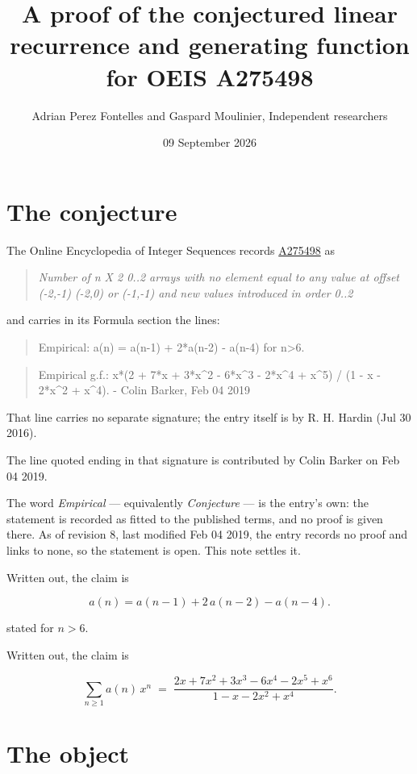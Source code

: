\documentclass[11pt]{article}
\title{A proof of the conjectured linear recurrence and generating function for OEIS A275498}
\author{Adrian Perez Fontelles and Gaspard Moulinier, Independent researchers}
\date{09 September 2026}
\theoremstyle{definition}
\begin{document}
\maketitle
\section{The conjecture}

The Online Encyclopedia of Integer Sequences records \href{https://oeis.org/A275498}{A275498} as

\begin{quote}\itshape Number of n X 2 0..2 arrays with no element equal to any value at offset (-2,-1) (-2,0) or (-1,-1) and new values introduced in order 0..2\end{quote}

and carries in its Formula section the lines:

\begin{quote}\ttfamily Empirical: a(n) = a(n-1) + 2*a(n-2) - a(n-4) for n>6.\end{quote}

\begin{quote}\ttfamily Empirical g.f.: x*(2 + 7*x + 3*x\textasciicircum{}2 - 6*x\textasciicircum{}3 - 2*x\textasciicircum{}4 + x\textasciicircum{}5) / (1 - x - 2*x\textasciicircum{}2 + x\textasciicircum{}4). - Colin Barker, Feb 04 2019\end{quote}

That line carries no separate signature; the entry itself is by R. H. Hardin (Jul 30 2016).

The line quoted ending in that signature is contributed by Colin Barker on Feb 04 2019.

The word {\itshape Empirical} --- equivalently {\itshape Conjecture} --- is the entry's own: the statement is recorded as fitted to the published terms, and no proof is given there. As of revision 8, last modified Feb 04 2019, the entry records no proof and links to none, so the statement is open. This note settles it.

Written out, the claim is

\[a(n) = a(n-1) + 2\,a(n-2) - a(n-4).\]

stated for $n > 6$.

Written out, the claim is

\[\sum_{n \ge 1} a(n)\,x^n \;=\; \frac{2x + 7x^{2} + 3x^{3} - 6x^{4} - 2x^{5} + x^{6}}{1 - x - 2x^{2} + x^{4}}.\]

\section{The object}
\end{document}
